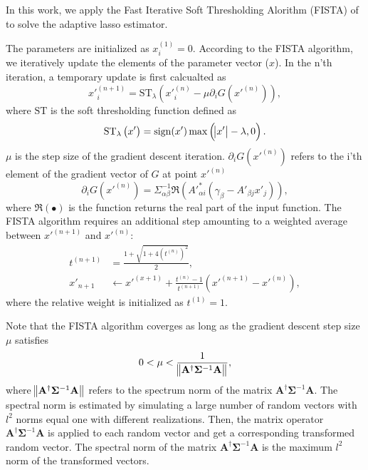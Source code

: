 \documentclass[twocolumn]{aastex62}
\begin{document}
In this work, we apply the Fast Iterative Soft Thresholding Alorithm (FISTA) of \citet{FISTA-Beck2009} to solve 
the adaptive lasso estimator.

The parameters are initialized as $x_i^{(1)}=0$. According to the FISTA algorithm, we iteratively 
update the elements of the parameter vector ($x$). In the n'th iteration, a temporary update is first calcualted as
\begin{equation}
x'^{(n+1)}_{i}=\mathrm{ST}_{\lambda} \left(x'^{(n)}_{i} -\mu \partial_i G(x'^{(n)})\right),
\end{equation}
where $\mathrm{ST}$ is the soft thresholding function defined as
\begin{equation}
\mathrm{ST}_{\lambda} \left(x'\right) = \mathrm{sign} (x') \max \left(\abs{x'}-\lambda,0\right).
\end{equation}
$\mu$ is the step size of the gradient descent iteration. 
$\partial_i G(x'^{(n)})$ refers to the i'th element of the gradient
vector of $G$ at point $x'^{(n)}$
\begin{equation}
\partial_i G(x'^{(n)})=\Sigma^{-1}_{\alpha\beta}\Re\left(A'^{*}_{\alpha i}(\gamma_{\beta}-A'_{\beta j}x'_{j})\right),
\end{equation}
where $\Re\left( \bullet \right)$ is the function returns the real part of the input function.
The FISTA algorithm requires an additional step amounting to a weighted average between
$x'^{(n+1)}$ and $x'^{(n)}$:
\begin{equation}
\begin{split}
t^{(n+1)}&=\frac{1+\sqrt{1+4(t^{(n)})^2}}{2},\\
x'_{n+1} &\leftarrow x'^{(x+1)}+ \frac{t^{(n)}-1}{t^{(n+1)}}(x'^{(n+1)}-x'^{(n)}),
\end{split}
\end{equation}
where the relative weight is initialized as $t^{(1)}=1$.

Note that the FISTA algorithm coverges as long as the gradient descent step size $\mu$ satisfies
\begin{equation}
 0< \mu < \frac{1}{ \norm{\mathbf{A^{\dagger}} \mathbf{\Sigma}^{-1} \mathbf{A} }},
\end{equation}
where $\norm{\mathbf{A^{\dagger}} \mathbf{\Sigma}^{-1} \mathbf{A} }$ refers to the spectrum norm of the matrix
$\mathbf{A^{\dagger}} \mathbf{\Sigma}^{-1} \mathbf{A}$. The spectral norm is estimated by simulating a large number of 
random vectors with $l^2$ norms equal one with different realizations. Then, the matrix operator 
$\mathbf{A^{\dagger}} \mathbf{\Sigma}^{-1} \mathbf{A}$ is applied to each random vector and get a corresponding transformed 
random vector. The spectral norm of the matrix $\mathbf{A^{\dagger}} \mathbf{\Sigma}^{-1} \mathbf{A}$
is the maximum $l^2$ norm of the transformed vectors.
\end{document}

